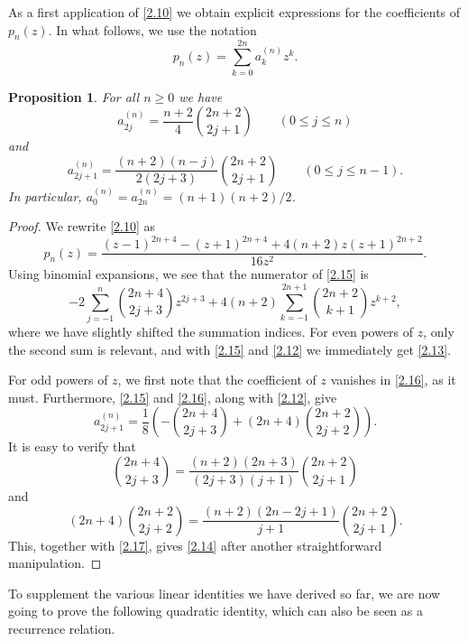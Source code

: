 \documentclass{amsart}
\theoremstyle{plain}
\newtheorem{proposition}[theorem]{Proposition}
\numberwithin{equation}{section}
\begin{document}
As a first application of \eqref{2.10} we obtain explicit expressions for the
coefficients of $p_n(z)$. In what follows, we use the notation
\begin{equation}\label{2.12}
p_n(z) = \sum_{k=0}^{2n}a_k^{(n)} z^k.
\end{equation}

\begin{proposition}\label{prop:2.3}
For all $n\geq 0$ we have
\begin{equation}\label{2.13}
a_{2j}^{(n)}=\frac{n+2}{4}\binom{2n+2}{2j+1}\qquad(0\leq j\leq n)
\end{equation}
and
\begin{equation}\label{2.14}
a_{2j+1}^{(n)}=\frac{(n+2)(n-j)}{2(2j+3)}\binom{2n+2}{2j+1}
\qquad(0\leq j\leq n-1).
\end{equation}
In particular, $a_0^{(n)}=a_{2n}^{(n)}=(n+1)(n+2)/2$.
\end{proposition}

\begin{proof}
We rewrite \eqref{2.10} as
\begin{equation}\label{2.15}
p_n(z)=\frac{(z-1)^{2n+4}-(z+1)^{2n+4}+4(n+2)z(z+1)^{2n+2}}{16z^2}.
\end{equation}
Using binomial expansions, we see that the numerator of \eqref{2.15} is
\begin{equation}\label{2.16}
-2\sum_{j=-1}^n\binom{2n+4}{2j+3}z^{2j+3}
+4(n+2)\sum_{k=-1}^{2n+1}\binom{2n+2}{k+1}z^{k+2},
\end{equation}
where we have slightly shifted the summation indices. For even powers of $z$,
only the second sum is relevant, and with \eqref{2.15} and \eqref{2.12} we
immediately get \eqref{2.13}.

For odd powers of $z$, we first note that the coefficient of $z$ vanishes in
\eqref{2.16}, as it must. Furthermore, \eqref{2.15} and \eqref{2.16}, along
with \eqref{2.12}, give 
\begin{equation}\label{2.17}
a_{2j+1}^{(n)}
=\frac{1}{8}\left(-\binom{2n+4}{2j+3}+(2n+4)\binom{2n+2}{2j+2}\right).
\end{equation}
It is easy to verify that
\[
\binom{2n+4}{2j+3}=\frac{(n+2)(2n+3)}{(2j+3)(j+1)}\binom{2n+2}{2j+1}
\]
and
\[
(2n+4)\binom{2n+2}{2j+2}=\frac{(n+2)(2n-2j+1)}{j+1}\binom{2n+2}{2j+1}.
\]
This, together with \eqref{2.17}, gives \eqref{2.14} after another
straightforward manipulation.
\end{proof}

To supplement the various linear identities we have derived so far, we are
now going to prove the following quadratic identity, which can also be seen
as a recurrence relation.
 
\end{document}
